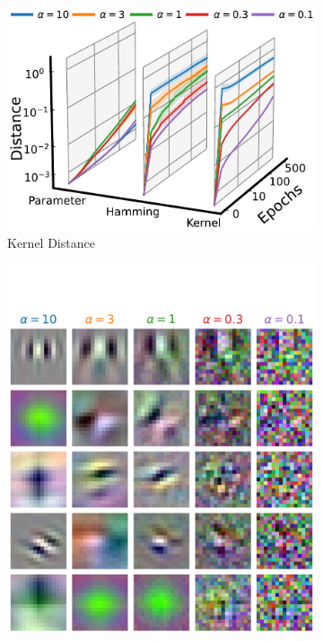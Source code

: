 \documentclass{article}
\theoremstyle{plain}
\theoremstyle{definition}
\theoremstyle{remark}
\begin{document}
\begin{figure}[t]
    \begin{subfigure}{0.30\textwidth}
        \centering
        \includegraphics[width=\linewidth]{fig/deep-networks/kernel.pdf}
        \caption{Kernel Distance}
    \end{subfigure}
    \begin{subfigure}{0.22\textwidth}
        \centering
        \includegraphics[width=\linewidth]{fig/deep-networks/gabors/gabors.pdf}

\end{subfigure}
\end{figure}
\end{document}
